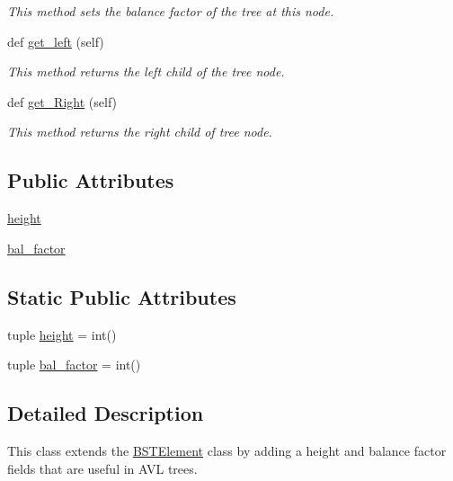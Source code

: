 \begin{DoxyCompactItemize}
\begin{DoxyCompactList}\small\item\em This method sets the balance factor of the tree at this node. \end{DoxyCompactList}\item 
def \hyperlink{class_bridges_1_1_a_v_l_tree_element_1_1_a_v_l_tree_element_a71d96415ebf9ac178130e7eea992a37f}{get\+\_\+left} (self)
\begin{DoxyCompactList}\small\item\em This method returns the left child of the tree node. \end{DoxyCompactList}\item 
def \hyperlink{class_bridges_1_1_a_v_l_tree_element_1_1_a_v_l_tree_element_ad4b8e91aac85054b9df40b3868a4f0f4}{get\+\_\+\+Right} (self)
\begin{DoxyCompactList}\small\item\em This method returns the right child of tree node. \end{DoxyCompactList}\end{DoxyCompactItemize}
\subsection*{Public Attributes}
\begin{DoxyCompactItemize}
\item 
\hyperlink{class_bridges_1_1_a_v_l_tree_element_1_1_a_v_l_tree_element_af8856cd0f69c2299f293fe5c4891651f}{height}
\item 
\hyperlink{class_bridges_1_1_a_v_l_tree_element_1_1_a_v_l_tree_element_a177be99460415a9fc520927c7d02ab65}{bal\+\_\+factor}
\end{DoxyCompactItemize}
\subsection*{Static Public Attributes}
\begin{DoxyCompactItemize}
\item 
tuple \hyperlink{class_bridges_1_1_a_v_l_tree_element_1_1_a_v_l_tree_element_a177f27815cb4e80c6bc80352dc4d9777}{height} = int()
\item 
tuple \hyperlink{class_bridges_1_1_a_v_l_tree_element_1_1_a_v_l_tree_element_a8fbb5d20ba6ffee247172f6d22ac0142}{bal\+\_\+factor} = int()
\end{DoxyCompactItemize}


\subsection{Detailed Description}
This class extends the \hyperlink{namespace_bridges_1_1_b_s_t_element}{B\+S\+T\+Element} class by adding a height and balance factor fields that are useful in A\+V\+L trees. 

